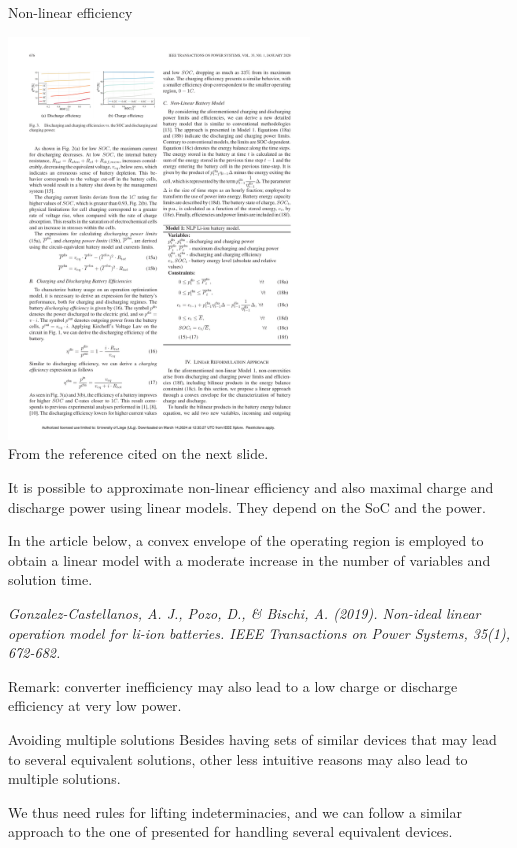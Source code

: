 \begin{frame}[allowframebreaks]{Non-linear efficiency}

    \begin{center}
        \includegraphics[width=0.6\textwidth]{images/Non-Ideal_Linear_Operation_Model_for_Li-Ion_Batteries.pdf} \\
        From the reference cited on the next slide.
    \end{center}
    
    It is possible to approximate non-linear efficiency and also maximal charge and discharge power using linear models.
    They depend on the SoC and the power. 
    
    In the article below, a convex envelope of the operating region is employed to obtain a linear model with a moderate increase in the number of variables and solution time.

    \textit{Gonzalez-Castellanos, A. J., Pozo, D., \& Bischi, A. (2019). Non-ideal linear operation model for li-ion batteries. IEEE Transactions on Power Systems, 35(1), 672-682.}

    Remark: converter inefficiency may also lead to a low charge or discharge efficiency at very low power.
\end{frame}


\begin{frame}{Avoiding multiple solutions}
    Besides having sets of similar devices that may lead to several equivalent solutions, other less intuitive reasons may also lead to multiple solutions.

    We thus need rules for lifting indeterminacies, and we can follow a similar approach to the one of presented for handling several equivalent devices.
\end{frame}

